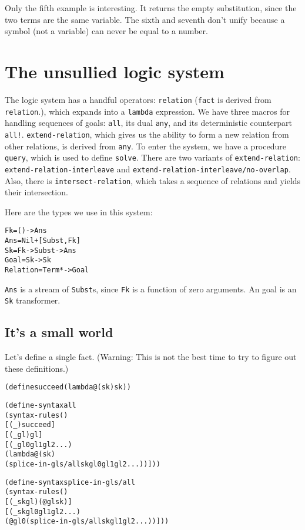 Only the fifth example is interesting.  It returns the empty
substitution, since the two terms are the same variable.  The sixth
and seventh don't unify because a symbol (not a variable) can never be
equal to a number.

\section{The unsullied logic system}

The logic system has a handful operators: \texttt{relation}
(\texttt{fact} is derived from \texttt{relation}.), which expands into
a \texttt{lambda} expression. We have three macros for handling
sequences of goals: \texttt{all}, its dual \texttt{any}, and its
deterministic counterpart \texttt{all!}.  \texttt{extend-relation},
which gives us the ability to form a new relation from other
relations, is derived from \texttt{any}.  To enter the system, we have
a procedure \texttt{query}, which is used to define \texttt{solve}.
There are two variants of \texttt{extend-relation}:
\texttt{extend-relation-interleave} and
\texttt{extend-relation-interleave/no-overlap}.  Also, there is
\texttt{intersect-relation}, which takes a sequence of relations and
yields their intersection.

Here are the types we use in this system:

\begin{alltt}
                  Fk = () -> Ans
                 Ans = Nil + [Subst, Fk]
                  Sk = Fk -> Subst -> Ans
          Goal = Sk -> Sk
            Relation = Term* -> Goal
\end{alltt}

\texttt{Ans} is a stream of \texttt{Subst}s, since \texttt{Fk} is
a function of zero arguments. An goal is an \texttt{Sk}
transformer.

\subsection{It's a small world}

Let's define a single fact. (Warning: This is not the best time to try
to figure out these definitions.)

\begin{alltt}
(define succeed (lambda@ (sk) sk))

(define-syntax all
  (syntax-rules ()
    [(_) succeed]
    [(_ gl) gl]
    [(_ gl0 gl1 gl2 ...)
     (lambda@ (sk)
       (splice-in-gls/all sk gl0 gl1 gl2 ...))]))

(define-syntax splice-in-gls/all
  (syntax-rules ()
    [(_ sk gl) (@ gl sk)]
    [(_ sk gl0 gl1 gl2 ...)
     (@ gl0 (splice-in-gls/all sk gl1 gl2 ...))]))
\end{alltt}


